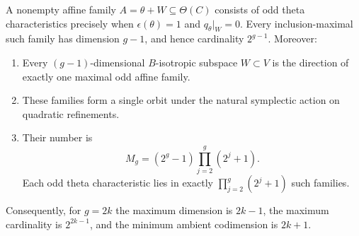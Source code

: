 \begin{theorem}
\label{thm:maximal-odd-affine}
A nonempty affine family \(A=\theta+W\subseteq\Theta(C)\) consists of
odd theta characteristics precisely when \(\epsilon(\theta)=1\) and
\(q_\theta|_W=0\). Every inclusion-maximal such family has dimension
\(g-1\), and hence cardinality \(2^{g-1}\). Moreover:
\begin{enumerate}
\item Every \((g-1)\)-dimensional \(B\)-isotropic subspace \(W\subset V\)
is the direction of exactly one maximal odd affine family.
\item These families form a single orbit under the natural symplectic
action on quadratic refinements.
\item Their number is
\begin{equation}
 M_g=(2^g-1)\prod_{j=2}^g(2^j+1).
 \label{eq:odd-family-count}
\end{equation}
Each odd theta characteristic lies in exactly
\(\prod_{j=2}^g(2^j+1)\) such families.
\end{enumerate}
Consequently, for \(g=2k\) the maximum dimension is \(2k-1\), the
maximum cardinality is \(2^{2k-1}\), and the minimum ambient codimension
is \(2k+1\).
\end{theorem}

